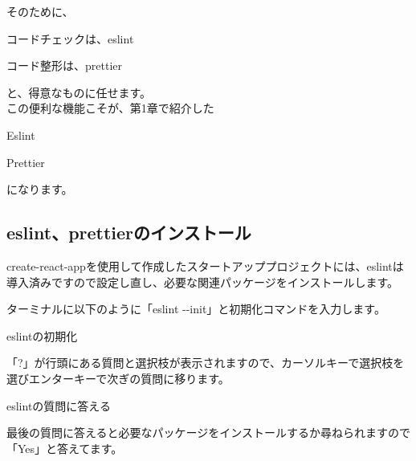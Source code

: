 そのために、\\[0pt]

\begin{starteritemize}
\item コードチェックは、eslint
\item コード整形は、prettier
\end{starteritemize}

と、得意なものに任せます。
\\[0pt]

この便利な機能こそが、第1章で紹介した\\[0pt]

\begin{starteritemize}
\item Eslint
\item Prettier
\end{starteritemize}

になります。
\\[0pt]

\subsection{eslint、prettierのインストール}
\keeplastskip{
  \label{sec:2-4-1}
  \label{sec-03eslint}
  \par\nobreak
}

create{-}react{-}appを使用して作成したスタートアッププロジェクトには、eslintは導入済みですので設定し直し、必要な関連パッケージをインストールします。

ターミナルに以下のように「eslint {-}{-}init」と初期化コマンドを入力します。

\def\startercodeblockfontsize{}
\begin{starterterminal}[]{eslintの初期化}\end{starterterminal}

「?」が行頭にある質問と選択枝が表示されますので、カーソルキーで選択枝を選びエンターキーで次ぎの質問に移ります。

\def\startercodeblockfontsize{}
\begin{starterterminal}[]{eslintの質問に答える}\end{starterterminal}

最後の質問に答えると必要なパッケージをインストールするか尋ねられますので「Yes」と答えてます。

